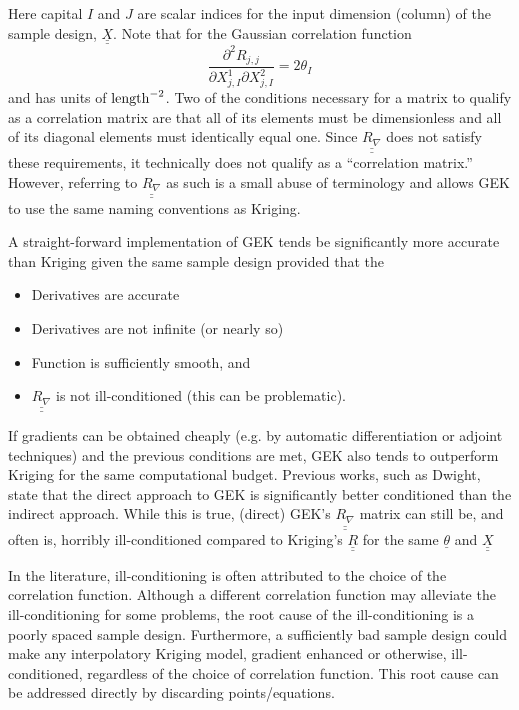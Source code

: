 Here capital $I$ and $J$ are scalar indices for the input dimension 
(column) of the sample design, $\underline{\underline{X}}$.  Note that 
for the Gaussian correlation function 
\begin{displaymath}
\frac{\partial^2 R_{j,j}}{\partial X_{j,I}^1 \partial X_{j,I}^2}=2\theta_I
\end{displaymath}
and has units of ${\rm length}^{-2}$.  Two of the conditions necessary for a 
matrix to qualify as a correlation matrix are that all of its elements must 
be dimensionless and all of its diagonal elements must identically equal 
one.  Since $\underline{\underline{R_{\nabla}}}$ does not satisfy these
requirements, it technically does not qualify as a ``correlation matrix.''
However, referring to $\underline{\underline{R_{\nabla}}}$ as such
is a small abuse of terminology and allows GEK to use the same naming 
conventions as Kriging.\newline

A straight-forward implementation of GEK tends be significantly more accurate 
than Kriging given the same sample design provided that the
\begin{itemize}
\item Derivatives are accurate
\item Derivatives are not infinite (or nearly so)
\item Function is sufficiently smooth, and
\item $\underline{\underline{R_{\nabla}}}$ is not ill-conditioned 
      (this can be problematic).
\end{itemize}
If gradients can be obtained cheaply (e.g. by automatic differentiation or 
adjoint techniques) and the previous conditions are met, GEK also tends to 
outperform Kriging for the same computational budget.  Previous works,
such as Dwight\cite{Dwi09}, state that the direct approach to
GEK is significantly better conditioned than the indirect approach.  While 
this is true, (direct) GEK's $\underline{\underline{R_{\nabla}}}$ matrix 
can still be, and often is, horribly ill-conditioned compared to Kriging's 
$\underline{\underline{R}}$ for the same $\underline{\theta}$ and 
$\underline{\underline{X}}$\newline

In the literature, ill-conditioning is often attributed to the choice
of the correlation function.  Although a different correlation function 
may alleviate the ill-conditioning for some problems, the root cause 
of the ill-conditioning is a poorly spaced sample design. Furthermore, 
a sufficiently bad sample design could make any interpolatory Kriging 
model, gradient enhanced or otherwise, ill-conditioned, regardless of 
the choice of correlation function.  This root cause can be addressed 
directly by discarding points/equations.\newline

